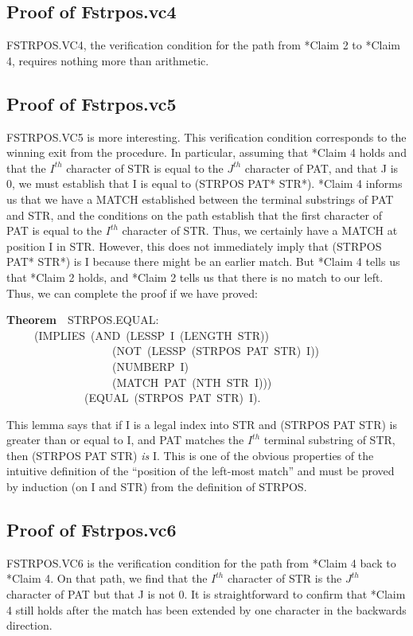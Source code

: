\documentclass[10pt]{book}
\newenvironment{pubasis}{\begin{flushleft}}{\end{flushleft}}
\newcommand{\axiomordefinition}[1]{\vspace{6pt}\Large\textsf{\textbf{#1}}\normalsize}
\begin{document}
\subsection{Proof of Fstrpos.vc4}
FSTRPOS.VC4, the verification condition for the path from *Claim 2
to *Claim 4, requires nothing more than arithmetic.

\subsection{Proof of Fstrpos.vc5}
FSTRPOS.VC5 is more interesting.  This verification condition
corresponds to the winning exit from the procedure.  In particular,
assuming that *Claim 4 holds and that the $I^{th}$ character
of STR is equal to the $J^{th}$ character of PAT, and that J is 0,
we must establish that I is equal to (STRPOS PAT* STR*).  *Claim 4
informs us that we have a MATCH established between the terminal
substrings of PAT and STR, and the conditions on the path
establish that the first character of PAT is equal to the $I^{th}$ character of STR.
Thus, we certainly have a MATCH at position I in STR.  However, this
does not immediately imply that (STRPOS PAT* STR*) is I because there
might be an earlier match.  But *Claim 4 tells us that
*Claim 2 holds, and *Claim 2 tells us that there is no match to our left.
Thus, we can complete the proof if we have proved:
\begin{pubasis}
\axiomordefinition{Theorem}~~STRPOS.EQUAL:\\
~~~~~(IMPLIES~(AND~(LESSP~I~(LENGTH~STR))\\
~~~~~~~~~~~~~~~~~~~(NOT~(LESSP~(STRPOS~PAT~STR)~I))\\
~~~~~~~~~~~~~~~~~~~(NUMBERP~I)\\
~~~~~~~~~~~~~~~~~~~(MATCH~PAT~(NTH~STR~I)))\\
~~~~~~~~~~~~~~(EQUAL~(STRPOS~PAT~STR)~I).\\
\end{pubasis}
This lemma says that if I is a legal index into STR and (STRPOS PAT STR)
is greater than or equal to I, and PAT matches the $I^{th}$ terminal substring
of STR, then (STRPOS PAT STR) \emph{is} I.  This is one of the obvious properties
of the intuitive definition of the ``position of the left-most match''
and must be proved by induction (on I and STR) from the definition of
STRPOS.

\subsection{Proof of Fstrpos.vc6}
FSTRPOS.VC6 is the verification condition for the path from *Claim 4 back to *Claim 4.
On that path, we find that the $I^{th}$ character of STR is
the $J^{th}$ character of PAT but that J is not 0.
It is straightforward to confirm that *Claim 4 still holds after
the match has been extended by one character in the backwards direction.
\end{document}
